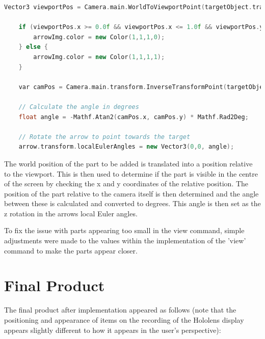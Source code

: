 \documentclass{l4proj}
\begin{document}
\begin{lstlisting}[language=c++, caption={The code for finding the direction of the arrow and showing/hiding the arrow if it is on or off the screen.}, label=lst:arrow]
    Vector3 viewportPos = Camera.main.WorldToViewportPoint(targetObject.transform.position);
                
    if (viewportPos.x >= 0.0f && viewportPos.x <= 1.0f && viewportPos.y >= 0.0f && viewportPos.y <= 1.0f) {
        arrowImg.color = new Color(1,1,1,0);
    } else {
        arrowImg.color = new Color(1,1,1,1);
    }

    var camPos = Camera.main.transform.InverseTransformPoint(targetObject.transform.position);

    // Calculate the angle in degrees
    float angle = -Mathf.Atan2(camPos.x, camPos.y) * Mathf.Rad2Deg;

    // Rotate the arrow to point towards the target
    arrow.transform.localEulerAngles = new Vector3(0,0, angle);

\end{lstlisting}

The world position of the part to be added is translated into a position relative to the viewport. This is then used to determine if the part is visible in the centre of the screen by checking the x and y coordinates of the relative position. The position of the part relative to the camera itself is then determined and the angle between these is calculated and converted to degrees. This angle is then set as the z rotation in the arrows local Euler angles.

To fix the issue with parts appearing too small in the view command, simple adjustments were made to the values within the implementation of the 'view' command to make the parts appear closer.

\section{Final Product}
The final product after implementation appeared as follows (note that the positioning and appearance of items on the recording of the Hololens display appears slightly different to how it appears in the user's perspective):
\end{document}
